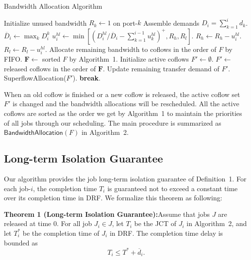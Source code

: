 \documentclass[10pt, conference, letterpaper]{IEEEtran}
\begin{document}
\begin{algorithm}
	\caption{Bandwidth Allocation Algorithm}
	\begin{algorithmic}[1]
			\State Initialize unused bandwidth $R_k \gets 1$ on port-$k$
				\State Assemble demands $D_i = \sum_{k=1}^id_k$.
				\State $\overline{D}_i \gets \max_kD_i^k$
					\State $u_i^{hl} \gets \min[(D_i^{hl}/\overline{D}_i - \sum_{k=1}^{i-1}u_k^{hl})^+, R_h,R_l]$.
					\State $R_h \gets R_h - u_i^{hl}$.
					\State $R_l \gets R_l - u_i^{hl}$.
				\EndFor
			\EndFor
			\State Allocate remaining bandwidth to coflows in the order of $F$ by FIFO.
		\EndProcedure
			\State $\mathbf{F} \gets$ sorted $F$ by Algorithm~1.
			\State Initialize active coflows $F' \gets \emptyset$.
				\State $F' \gets$ released coflows in the order of $\mathbf{F}$.
					\State Update remaining transfer demand of $F'$.
					\State SuperflowAllocation($F'$).
				\EndIf
					\State \textbf{break}.
				\EndIf
			\EndWhile
		\EndProcedure
	\end{algorithmic}
\end{algorithm}

When an old coflow is finished or a new coflow is released, the active coflow set $F'$ is changed and the bandwidth allocations will be rescheduled. All the active coflows are sorted as the order we get by Algorithm~1 to maintain the priorities of all jobs through our scheduling. The main procedure is summarized as $\mathsf{BandwidthAllocation}(F)$ in Algorithm~2.

\subsection{Long-term Isolation Guarantee}
Our algorithm provides the job long-term isolation guarantee of Definition~1. For each job-$i$, the completion time $T_i$ is guaranteed not to exceed a constant time over its completion time in DRF. We formalize this theorem as following:

\textbf{Theorem 1 (Long-term Isolation Guarantee):}Assume that jobs $J$ are released at time 0. For all job $J_i \in J$, let $T_i$ be the JCT of $J_i$ in Algorithm~2, and let $T_i^*$ be the completion time of $J_i$ in DRF. The completion time delay is bounded as
\begin{equation}
	T_i \leq T^* + \overline{d}_i.
\end{equation}
\end{document}
